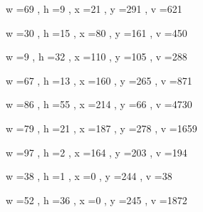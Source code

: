 \documentclass[11pt]{article}
\begin{document}
\par
w =69 , h =9 , x =21 , y =291 , v =621
\par
w =30 , h =15 , x =80 , y =161 , v =450
\par
w =9 , h =32 , x =110 , y =105 , v =288
\par
w =67 , h =13 , x =160 , y =265 , v =871
\par
w =86 , h =55 , x =214 , y =66 , v =4730
\par
w =79 , h =21 , x =187 , y =278 , v =1659
\par
w =97 , h =2 , x =164 , y =203 , v =194
\par
w =38 , h =1 , x =0 , y =244 , v =38
\par
w =52 , h =36 , x =0 , y =245 , v =1872
\par
\newpage
\end{document}
